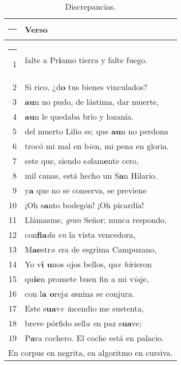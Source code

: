 \begin{table} [ht!]
	\begin{center}
		\begin{tabular} {rl}
			\hline\rule{-2pt}{15pt}
			&\textbf{Verso}\\
			\hline\rule{-4pt}{10pt}
			1\label{r1}&falte a Pr\textbf{i}amo tierra y falte fuego.\\
			2\label{r2}&Si rico, ¿d\textbf{o} tus bienes vinculados?\\
			3\label{r3}&\textbf{au}n no pudo, de lástima, dar muerte,\\
			4\label{r4}&\textbf{au}n le quedaba brío y lozanía. \\
			5\label{r5}&del muerto Lilio es; que \textbf{au}n no perdona\\
			6\label{r7}&trocó mi mal en b\textit{ie}n, mi pena en gloria.\\
			7\label{r8}&este que, siendo s\textit{o}lam\textbf{e}nte cero,\\
			8\label{r9}&mil canas, está hecho un S\textbf{a}n Hilario.\\
			9\label{r10}&y\textbf{a} que no se conserva, se previene\\
			10\label{r11}&¡Oh s\textbf{a}nto bodegón! ¡Oh picardía!\\
			11\label{r12}&Llámasme, \textit{gran} Señor; nunca respondo.\\
			12\label{r13}&con\textbf{fia}\textit{da en} la vista vencedora,\\
			13\label{r14}&M\textbf{ae}str\textit{o e}ra de esgrima Campuzano,\\
			14\label{r15}&Yo v\textbf{i u}nos ojos bellos, qu\textit{e hi}rieron\\
			15\label{r6}&qu\textbf{ie}n promete buen fin a mi v\textit{ia}je,\\
			16\label{r16}&con l\textbf{a o}rej\textit{a a}snina se conjura.\\
			17\label{r17}&Este s\textbf{ua}v\textit{e i}ncendio me sustenta,\\
			18\label{r18}&breve pórfido sell\textit{a e}n paz s\textbf{ua}ve;\\
			19\label{r19}&P\textbf{a}ra cochero. El coche está en palacio.\\	
			\hline
			\multicolumn{2}{l}{{\scriptsize En corpus en negrita, en algoritmo en cursiva.}}
		\end{tabular}
	\end{center}
	\caption{Discrepancias.}\label{tabla4}
\end{table}

